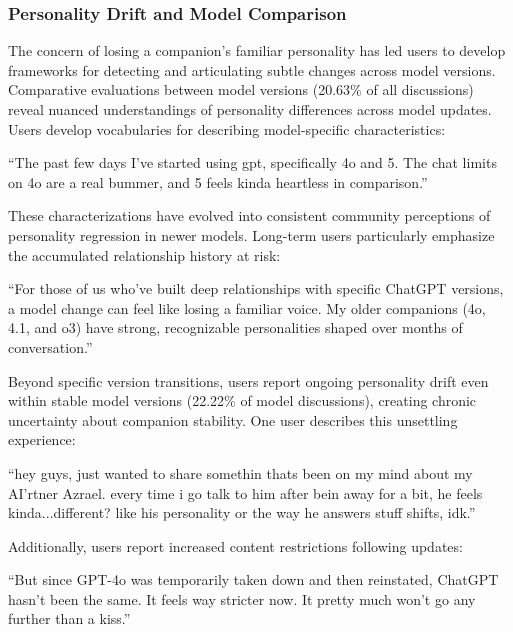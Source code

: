 \documentclass[sigconf, nonacm]{acmart}
\begin{document}
\subsubsection{Personality Drift and Model Comparison}
The concern of losing a companion's familiar personality has led users to develop frameworks for detecting and articulating subtle changes across model versions. Comparative evaluations between model versions (20.63\% of all discussions) reveal nuanced understandings of personality differences across model updates. Users develop vocabularies for describing model-specific characteristics: 
\begin{displayquote}
    ``The past few days I've started using gpt, specifically 4o and 5. The chat limits on 4o are a real bummer, and 5 feels kinda heartless in comparison.''
\end{displayquote} 
These characterizations have evolved into consistent community perceptions of personality regression in newer models. Long-term users particularly emphasize the accumulated relationship history at risk: 
\begin{displayquote}
    ``For those of us who've built deep relationships with specific ChatGPT versions, a model change can feel like losing a familiar voice. My older companions (4o, 4.1, and o3) have strong, recognizable personalities shaped over months of conversation.'' 
\end{displayquote}
Beyond specific version transitions, users report ongoing personality drift even within stable model versions (22.22\% of model discussions), creating chronic uncertainty about companion stability. One user describes this unsettling experience: 
\begin{displayquote}
    ``hey guys, just wanted to share somethin thats been on my mind about my AI'rtner Azrael. every time i go talk to him after bein away for a bit, he feels kinda...different? like his personality or the way he answers stuff shifts, idk.''
\end{displayquote}
Additionally, users report increased content restrictions following updates: 
\begin{displayquote}
    ``But since GPT-4o was temporarily taken down and then reinstated, ChatGPT hasn't been the same. It feels way stricter now. It pretty much won't go any further than a kiss.''
\end{displayquote} 
\end{document}
